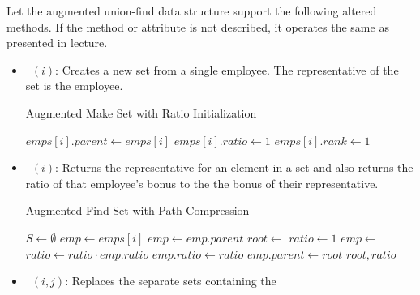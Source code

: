\documentclass[12pt,twoside]{article}
\begin{document}
\begin{problems}
Let the augmented union-find data structure support the following altered
methods. If the method or attribute is not described, it operates the same as
presented in lecture.

\begin{itemize}
    \item\ $(i)$: Creates a new set from a single employee. The
        representative of the set is the employee.
        \begin{breakablealgorithm}
            \caption{Augmented Make Set with Ratio Initialization}
            \begin{algorithmic}[1]
                    \State $emps[i].parent \leftarrow emps[i]$
                    \State $emps[i].ratio \leftarrow 1$
                    \State $emps[i].rank \leftarrow 1$
                \EndFunction
            \end{algorithmic}
        \end{breakablealgorithm}
    \item\ $(i)$: Returns the representative for an element in a
        set and also returns the ratio of that employee's bonus to the the
        bonus of their representative. 
        \begin{breakablealgorithm}
            \caption{Augmented Find Set with Path Compression}
            \begin{algorithmic}[1]
                    \State $S \leftarrow \emptyset$
                    \State $emp \leftarrow emps[i]$
                    \State {}
                        \State $emp \leftarrow emp.parent$
                        \State {}
                    \EndWhile
                    \State $root \leftarrow$ 
                    \State $ratio \leftarrow 1$
                        \State $emp \leftarrow$  
                        \State $ratio \leftarrow ratio \cdot emp.ratio$
                        \State $emp.ratio \leftarrow ratio$
                        \State $emp.parent \leftarrow root$
                    \EndWhile
                    \State \Return $root, ratio$
                \EndFunction
            \end{algorithmic}
        \end{breakablealgorithm}
    \item\ $(i, j)$: Replaces the separate sets containing the 

\end{itemize}
\end{problems}
\end{document}
